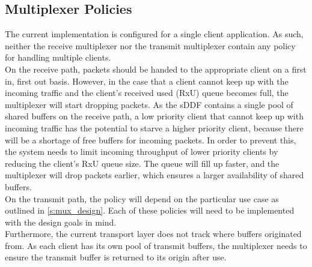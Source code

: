 \subsection{Multiplexer Policies} \label{s:mux_pol}
The current implementation is configured for a single client application. As such, neither the receive multiplexer
nor the transmit multiplexer contain any policy for handling multiple clients.\\
On the receive path, packets should be handed to the appropriate client on a first in, first out basis. However, 
in the case that a client cannot keep up with the incoming traffic and the client's received used (RxU) queue becomes full,
the multiplexer will start dropping packets. As the sDDF contains a single pool of shared buffers on the receive path,
a low priority client that cannot keep up with incoming traffic has the potential to starve a higher priority client, 
because there will be a shortage of free buffers for incoming packets. In order to prevent this, the system needs
to limit incoming throughput of lower priority clients by reducing the client's RxU queue size. The queue will 
fill up faster, and the multiplexer will drop packets earlier, which ensures a larger availability of shared buffers.\\
On the transmit path, the policy will depend on the particular use case as outlined in \autoref{s:mux_design}. Each of these
policies will need to be implemented with the design goals in mind.\\
Furthermore, the current transport layer does not track where buffers originated from. As each client has its own
pool of transmit buffers, the multiplexer needs to ensure the transmit buffer is returned to its origin after use.

